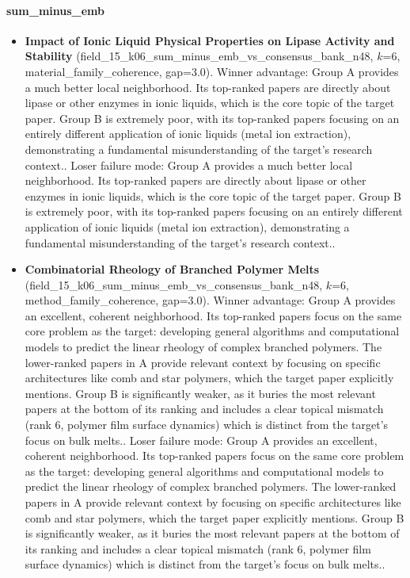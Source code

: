 \paragraph{sum\_minus\_emb}
\begin{itemize}
\item \textbf{Impact of Ionic Liquid Physical Properties on Lipase Activity and Stability} (field\_15\_k06\_sum\_minus\_emb\_vs\_consensus\_bank\_n48, $k$=6, material\_family\_coherence, gap=3.0). Winner advantage: Group A provides a much better local neighborhood. Its top-ranked papers are directly about lipase or other enzymes in ionic liquids, which is the core topic of the target paper. Group B is extremely poor, with its top-ranked papers focusing on an entirely different application of ionic liquids (metal ion extraction), demonstrating a fundamental misunderstanding of the target's research context.. Loser failure mode: Group A provides a much better local neighborhood. Its top-ranked papers are directly about lipase or other enzymes in ionic liquids, which is the core topic of the target paper. Group B is extremely poor, with its top-ranked papers focusing on an entirely different application of ionic liquids (metal ion extraction), demonstrating a fundamental misunderstanding of the target's research context..
\item \textbf{Combinatorial Rheology of Branched Polymer Melts} (field\_15\_k06\_sum\_minus\_emb\_vs\_consensus\_bank\_n48, $k$=6, method\_family\_coherence, gap=3.0). Winner advantage: Group A provides an excellent, coherent neighborhood. Its top-ranked papers focus on the same core problem as the target: developing general algorithms and computational models to predict the linear rheology of complex branched polymers. The lower-ranked papers in A provide relevant context by focusing on specific architectures like comb and star polymers, which the target paper explicitly mentions. Group B is significantly weaker, as it buries the most relevant papers at the bottom of its ranking and includes a clear topical mismatch (rank 6, polymer film surface dynamics) which is distinct from the target's focus on bulk melts.. Loser failure mode: Group A provides an excellent, coherent neighborhood. Its top-ranked papers focus on the same core problem as the target: developing general algorithms and computational models to predict the linear rheology of complex branched polymers. The lower-ranked papers in A provide relevant context by focusing on specific architectures like comb and star polymers, which the target paper explicitly mentions. Group B is significantly weaker, as it buries the most relevant papers at the bottom of its ranking and includes a clear topical mismatch (rank 6, polymer film surface dynamics) which is distinct from the target's focus on bulk melts..

\end{itemize}
